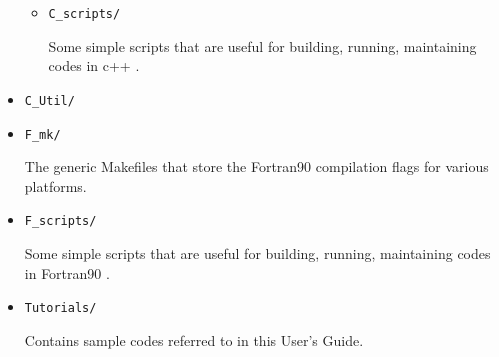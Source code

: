 \begin{itemize}
\begin{itemize}
  \item {\tt C\_scripts/}

  Some simple scripts that are useful for building, running,
  maintaining codes in c++ \BoxLib.

  \end{itemize}

  \item {\tt C\_Util/}
  \item {\tt F\_mk/}

  The generic Makefiles that store the Fortran90 compilation flags for
  various platforms.

  \item {\tt F\_scripts/}

  Some simple scripts that are useful for building, running,
  maintaining codes in Fortran90 \BoxLib.

\item {\tt Tutorials/}

  Contains sample codes referred to in this User's Guide.

\end{itemize}
